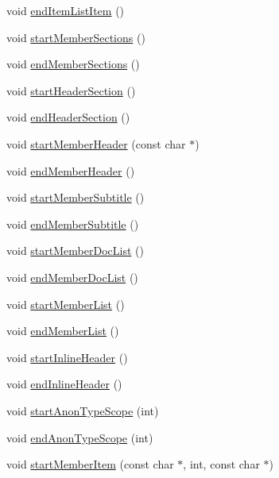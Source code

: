 \begin{DoxyCompactItemize}
void \hyperlink{class_r_t_f_generator_a4d3cc3baac4adda9ef5da4c9e470871b}{end\+Item\+List\+Item} ()
\item 
void \hyperlink{class_r_t_f_generator_a9a1d6fe62762d3b98b98955a73c78f83}{start\+Member\+Sections} ()
\item 
void \hyperlink{class_r_t_f_generator_aff41f57d28ce59191f7527212ebdccb3}{end\+Member\+Sections} ()
\item 
void \hyperlink{class_r_t_f_generator_ac7b3d7b5f30f3d12a9168c63d8558b01}{start\+Header\+Section} ()
\item 
void \hyperlink{class_r_t_f_generator_af0d6ecfbd929b6bf84515c7a9c0c912f}{end\+Header\+Section} ()
\item 
void \hyperlink{class_r_t_f_generator_af2fb1a0850bbfd2fec3e0c17ea78cefd}{start\+Member\+Header} (const char $\ast$)
\item 
void \hyperlink{class_r_t_f_generator_abeb6f88fba52b06469815b77955c08c4}{end\+Member\+Header} ()
\item 
void \hyperlink{class_r_t_f_generator_a345410be789206cba4ff9a83c2c35f10}{start\+Member\+Subtitle} ()
\item 
void \hyperlink{class_r_t_f_generator_a4009bce7747144b2da4a0c348979530a}{end\+Member\+Subtitle} ()
\item 
void \hyperlink{class_r_t_f_generator_aa34bc87c9ef0a6de2da83d975614a3ce}{start\+Member\+Doc\+List} ()
\item 
void \hyperlink{class_r_t_f_generator_ac0999848e2812490e2abbdfe8502756a}{end\+Member\+Doc\+List} ()
\item 
void \hyperlink{class_r_t_f_generator_aa4311935ebcc3dc94c2aa1d0da50ce4d}{start\+Member\+List} ()
\item 
void \hyperlink{class_r_t_f_generator_a026c22840d726a32660cc3d4d58b0c79}{end\+Member\+List} ()
\item 
void \hyperlink{class_r_t_f_generator_a619545578f99c0642f9d2f82dba69468}{start\+Inline\+Header} ()
\item 
void \hyperlink{class_r_t_f_generator_a264502d6589fff99ab0e01f3600cad57}{end\+Inline\+Header} ()
\item 
void \hyperlink{class_r_t_f_generator_abb1984b3f75a50b57e68fff9570a608e}{start\+Anon\+Type\+Scope} (int)
\item 
void \hyperlink{class_r_t_f_generator_a99b1d699a7530ecb1542c9a76bc60cb0}{end\+Anon\+Type\+Scope} (int)
\item 
void \hyperlink{class_r_t_f_generator_ad148e67bb61bb3c7dd7392e7a2786353}{start\+Member\+Item} (const char $\ast$, int, const char $\ast$)

\end{DoxyCompactItemize}
